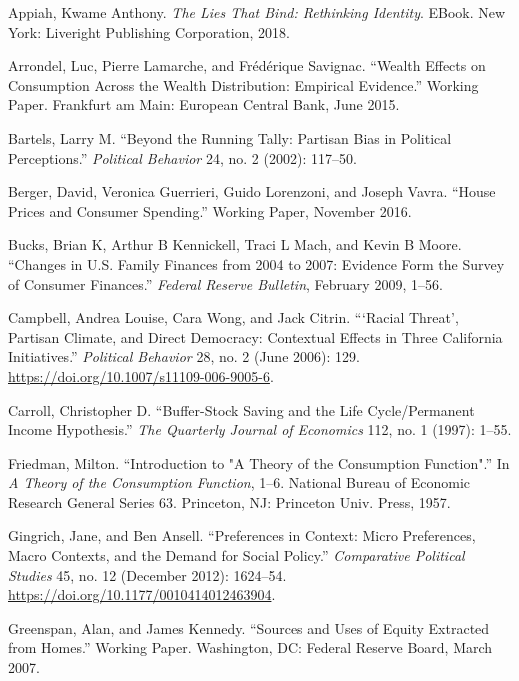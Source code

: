 \documentclass[
]{article}
\begin{document}
\leavevmode\hypertarget{ref-appiah2018lies}{}%
Appiah, Kwame Anthony. \emph{The Lies That Bind: Rethinking Identity}. EBook. New York: Liveright Publishing Corporation, 2018.

\leavevmode\hypertarget{ref-arrondel2015wealth}{}%
Arrondel, Luc, Pierre Lamarche, and Frédérique Savignac. ``Wealth Effects on Consumption Across the Wealth Distribution: Empirical Evidence.'' Working Paper. Frankfurt am Main: European Central Bank, June 2015.

\leavevmode\hypertarget{ref-bartels2002running}{}%
Bartels, Larry M. ``Beyond the Running Tally: Partisan Bias in Political Perceptions.'' \emph{Political Behavior} 24, no. 2 (2002): 117--50.

\leavevmode\hypertarget{ref-berger2016house}{}%
Berger, David, Veronica Guerrieri, Guido Lorenzoni, and Joseph Vavra. ``House Prices and Consumer Spending.'' Working Paper, November 2016.

\leavevmode\hypertarget{ref-bucks2009changes}{}%
Bucks, Brian K, Arthur B Kennickell, Traci L Mach, and Kevin B Moore. ``Changes in U.S. Family Finances from 2004 to 2007: Evidence Form the Survey of Consumer Finances.'' \emph{Federal Reserve Bulletin}, February 2009, 1--56.

\leavevmode\hypertarget{ref-campbell2006racial}{}%
Campbell, Andrea Louise, Cara Wong, and Jack Citrin. ```Racial Threat', Partisan Climate, and Direct Democracy: Contextual Effects in Three California Initiatives.'' \emph{Political Behavior} 28, no. 2 (June 2006): 129. \url{https://doi.org/10.1007/s11109-006-9005-6}.

\leavevmode\hypertarget{ref-carroll1997bufferstock}{}%
Carroll, Christopher D. ``Buffer-Stock Saving and the Life Cycle/Permanent Income Hypothesis.'' \emph{The Quarterly Journal of Economics} 112, no. 1 (1997): 1--55.

\leavevmode\hypertarget{ref-friedman1957introduction}{}%
Friedman, Milton. ``Introduction to "A Theory of the Consumption Function".'' In \emph{A Theory of the Consumption Function}, 1--6. National Bureau of Economic Research General Series 63. Princeton, NJ: Princeton Univ. Press, 1957.

\leavevmode\hypertarget{ref-gingrich2012preferences}{}%
Gingrich, Jane, and Ben Ansell. ``Preferences in Context: Micro Preferences, Macro Contexts, and the Demand for Social Policy.'' \emph{Comparative Political Studies} 45, no. 12 (December 2012): 1624--54. \url{https://doi.org/10.1177/0010414012463904}.

\leavevmode\hypertarget{ref-greenspan2007sources}{}%
Greenspan, Alan, and James Kennedy. ``Sources and Uses of Equity Extracted from Homes.'' Working Paper. Washington, DC: Federal Reserve Board, March 2007.
\end{document}
